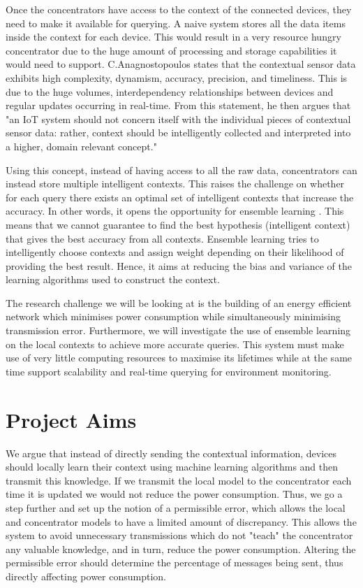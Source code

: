 \documentclass{mproj}
\begin{document}
Once the concentrators have access to the context of the connected devices, they need to make it available for querying. A naive system stores all the data items inside the context for each device. This would result in a very resource hungry concentrator due to the huge amount of processing and storage capabilities it would need to support. C.Anagnostopoulos \cite{intelligentContextualInformation} states that the contextual sensor data exhibits high complexity, dynamism, accuracy, precision, and timeliness. This is due to the huge volumes, interdependency relationships between devices and regular updates occurring in real-time. From this statement, he then argues that "an IoT system should not concern itself with the individual pieces of contextual sensor data: rather, context should be intelligently collected and interpreted into a higher, domain relevant concept." \cite{intelligentContextualInformation}

Using this concept, instead of having access to all the raw data, concentrators can instead store multiple intelligent contexts. This raises the challenge on whether for each query there exists an optimal set of intelligent contexts that increase the accuracy. In other words, it opens the opportunity for ensemble learning \cite{dietterich2002ensemble}. This means that we cannot guarantee to find the best hypothesis (intelligent context) that gives the best accuracy from all contexts. Ensemble learning tries to intelligently choose contexts and assign weight depending on their likelihood of providing the best result. Hence, it aims at reducing the bias and variance of the learning algorithms used to construct the context. \cite{dietterich2002ensemble}

The research challenge we will be looking at is the building of an energy efficient network which minimises power consumption while simultaneously minimising transmission error. Furthermore, we will investigate the use of ensemble learning on the local contexts to achieve more accurate queries. This system must make use of very little computing resources to maximise its lifetimes while at the same time support scalability and real-time querying for environment monitoring.

\section{Project Aims}
We argue that instead of directly sending the contextual information, devices should locally learn their context using machine learning algorithms and then transmit this knowledge. If we transmit the local model to the concentrator each time it is updated we would not reduce the power consumption. Thus, we go a step further and set up the notion of a  permissible error, which allows the local and concentrator models to have a limited amount of discrepancy. This allows the system to avoid unnecessary transmissions which do not "teach" the concentrator any valuable knowledge, and in turn, reduce the power consumption. Altering the permissible error should determine the percentage of messages being sent, thus directly affecting power consumption.
\end{document}
